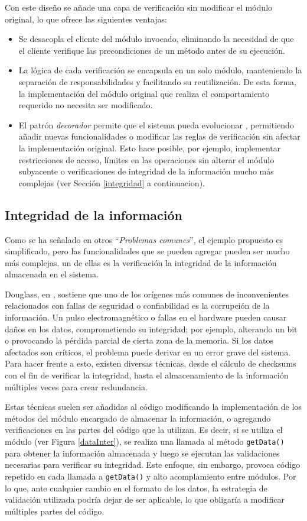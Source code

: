 Con este diseño se añade una capa de verificación sin modificar el módulo original, lo que ofrece las siguientes ventajas:
\begin{itemize}
\item Se desacopla el cliente del módulo invocado, eliminando la necesidad de que el cliente verifique las precondiciones de un método antes de su ejecución.
\item La lógica de cada verificación se encapsula en un solo módulo, manteniendo la separación de responsabilidades y facilitando su reutilización. De esta forma, la implementación del módulo original que realiza el comportamiento requerido no necesita ser modificado.
\item El patrón \textit{decorador} permite que el sistema pueda evolucionar , permitiendo añadir nuevas funcionalidades o modificar las reglas de verificación sin afectar la implementación original. Esto hace posible, por ejemplo, implementar restricciones de acceso, límites en las operaciones sin alterar el módulo subyacente o verificaciones de integridad de la información mucho más complejas (ver Sección \ref{integridad} a continuacion).
\end{itemize}

\subsection*{Integridad de la información}
\label{integridad}

Como se ha señalado en otros ``\textit{Problemas comunes}'', el ejemplo propuesto es simplificado, pero las funcionalidades que se pueden agregar pueden ser mucho más complejas. un de ellas es la verificación la integridad de la información almacenada en el sistema.

Douglass, en \cite{douglass}, sostiene que uno de los orígenes más comunes de inconvenientes relacionados con fallas de seguridad o confiabilidad es la corrupción de la información. Un pulso electromagnético o fallas en el hardware pueden causar daños en los datos, comprometiendo su integridad; por ejemplo, alterando un \gls{bit} o provocando la pérdida parcial de cierta zona de la memoria. Si los datos afectados son críticos, el problema puede derivar en un error grave del sistema. Para hacer frente a esto, existen diversas técnicas, desde el cálculo de checksums con el fin de verificar la integridad, hasta el almacenamiento de la información múltiples veces para crear redundancia.

Estas técnicas suelen ser añadidas al código modificando la implementación de los métodos del módulo encargado de almacenar la información, o agregando verificaciones en las partes del código que la utilizan. Es decir, si se utiliza el módulo \Data (ver Figura \ref{dataInter}), se realiza una llamada al método \verb|getData()| para obtener la información almacenada y luego se ejecutan las validaciones necesarias para verificar su integridad. Este enfoque, sin embargo, provoca código repetido en cada llamada a \verb|getData()| y alto acomplamiento entre módulos. Por lo que, ante cualquier cambio en el formato de los datos, la estrategia de validación utilizada podría dejar de ser aplicable, lo que obligaría a modificar múltiples partes del código.

